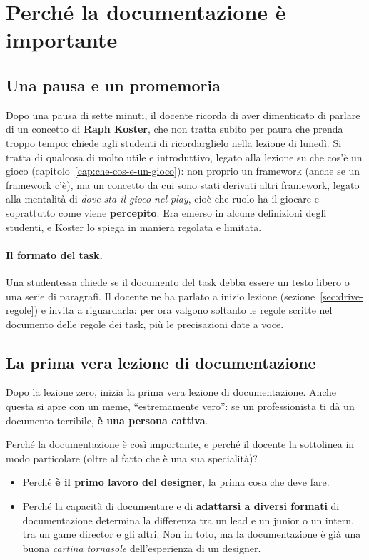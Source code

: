 \section{Perché la documentazione è importante}
\label{sec:perche-documentare}

\subsection{Una pausa e un promemoria}

Dopo una pausa di sette minuti, il docente ricorda di aver dimenticato di
parlare di un concetto di \textbf{Raph Koster}, che non tratta subito per
paura che prenda troppo tempo: chiede agli studenti di ricordarglielo nella
lezione di lunedì. Si tratta di qualcosa di molto utile e introduttivo,
legato alla lezione su che cos'è un gioco (capitolo~\ref{cap:che-cos-e-un-gioco}):
non proprio un framework (anche se un framework c'è), ma un concetto da cui
sono stati derivati altri framework, legato alla mentalità di \emph{dove sta
il gioco nel play}, cioè che ruolo ha il giocare e soprattutto come viene
\textbf{percepito}. Era emerso in alcune definizioni degli studenti, e Koster
lo spiega in maniera regolata e limitata.

\paragraph{Il formato del task.} Una studentessa chiede se il documento del
task debba essere un testo libero o una serie di paragrafi. Il docente ne ha
parlato a inizio lezione (sezione~\ref{sec:drive-regole}) e invita a
riguardarla: per ora valgono soltanto le regole scritte nel documento delle
regole dei task, più le precisazioni date a voce.

\subsection{La prima vera lezione di documentazione}

Dopo la lezione zero, inizia la prima vera lezione di documentazione. Anche
questa si apre con un meme, ``estremamente vero'': se un professionista ti dà
un documento terribile, \textbf{è una persona cattiva}.

Perché la documentazione è così importante, e perché il docente la
sottolinea in modo particolare (oltre al fatto che è una sua specialità)?
\begin{itemize}
  \item Perché \textbf{è il primo lavoro del designer}, la prima cosa che
        deve fare.
  \item Perché la capacità di documentare e di \textbf{adattarsi a diversi
        formati} di documentazione determina la differenza tra un lead e un
        junior o un intern, tra un game director e gli altri. Non in toto, ma
        la documentazione è già una buona \emph{cartina tornasole}
        dell'esperienza di un designer.
\end{itemize}

